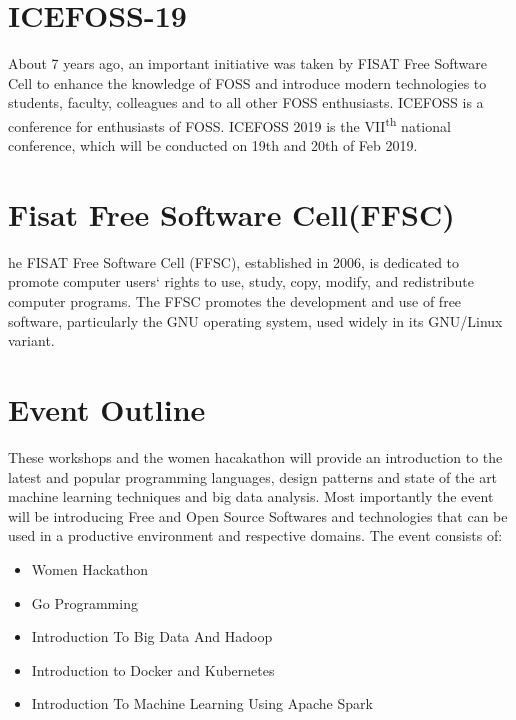 \documentclass[notuble,10pt,a4paper]{leaflet}
\begin{document}


\thispagestyle{empty} 
\newpage
\section{{\Large{ICEFOSS-19}}}
About 7 years ago, an important initiative was taken by FISAT Free Software Cell to enhance the knowledge of FOSS and introduce modern technologies to students, faculty, colleagues and to all other FOSS enthusiasts. ICEFOSS is a conference for enthusiasts of FOSS. ICEFOSS 2019 is the VII\textsuperscript{th} national conference, which will be conducted on 19th and 20th of Feb 2019. 

\section{{\Large{Fisat Free Software Cell(FFSC)}}}
he FISAT Free Software Cell (FFSC), established in 2006, is dedicated to promote computer users` rights to use, study, copy, modify, and redistribute computer programs. The FFSC promotes the development and use of free software, particularly the GNU operating system, used widely in its GNU/Linux variant.
\section{{\Large Event Outline}}

These workshops and the women hacakathon will provide an introduction to the latest and popular programming languages, design patterns and state of the art machine learning techniques and big data analysis. Most importantly the event will be introducing Free and Open Source Softwares and technologies that can be used in a productive environment and respective domains. The event consists of:
\begin{itemize}
\item Women Hackathon
\item Go Programming
\item Introduction To Big Data And Hadoop
\item Introduction to Docker and Kubernetes
\item Introduction To Machine Learning Using Apache Spark
\end{itemize}
\end{document}
